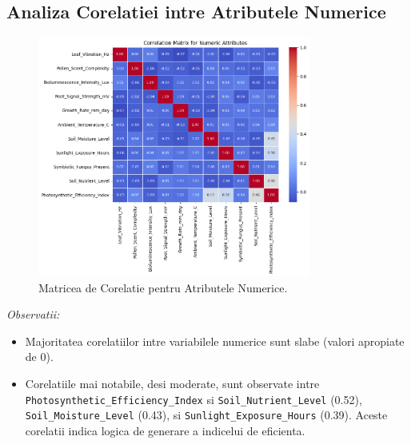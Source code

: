 \documentclass[11pt, a4paper]{article}
\begin{document}
\subsection{Analiza Corelatiei intre Atributele Numerice}
\begin{figure}[H]
    \centering
    \includegraphics[width=0.8\textwidth]{correlation.png} %
    \caption{Matricea de Corelatie pentru Atributele Numerice.}
    \label{fig:correlation_matrix}
\end{figure}

\textit{Observatii:}
\sloppy
\begin{itemize}[noitemsep, topsep=1pt]
    \item Majoritatea corelatiilor intre variabilele numerice sunt slabe (valori apropiate de 0).
    \item Corelatiile mai notabile, desi moderate, sunt observate intre \texttt{Photosynthetic\_Efficiency\_Index} si \texttt{Soil\_Nutrient\_Level} (0.52), \texttt{Soil\_Moisture\_Level} (0.43), si \texttt{Sunlight\_Exposure\_Hours} (0.39). Aceste corelatii indica logica de generare a indicelui de eficienta.
\end{itemize}
\end{document}
